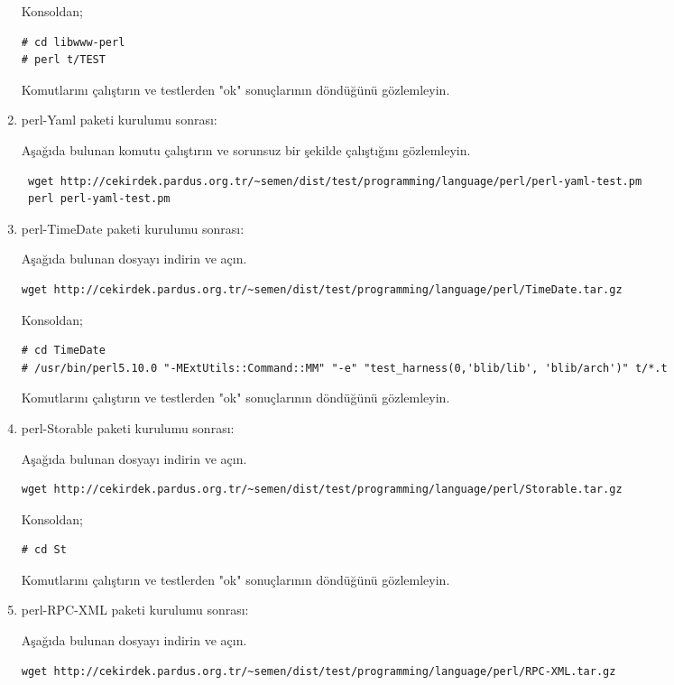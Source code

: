 \documentclass[a4paper,10pt]{article}
\begin{document}
\begin{enumerate}
Konsoldan;
\begin{verbatim}
# cd libwww-perl
# perl t/TEST
\end{verbatim}

Komutlarını çalıştırın ve testlerden "ok" sonuçlarının döndüğünü gözlemleyin.

\item perl-Yaml paketi kurulumu sonrası:

Aşağıda bulunan komutu çalıştırın ve sorunsuz bir şekilde çalıştığını gözlemleyin.
\begin{verbatim}
 wget http://cekirdek.pardus.org.tr/~semen/dist/test/programming/language/perl/perl-yaml-test.pm
 perl perl-yaml-test.pm
\end{verbatim}

\item perl-TimeDate paketi kurulumu sonrası:

Aşağıda bulunan dosyayı indirin ve açın.
\begin{verbatim}
wget http://cekirdek.pardus.org.tr/~semen/dist/test/programming/language/perl/TimeDate.tar.gz
\end{verbatim}

Konsoldan;
\begin{verbatim}
# cd TimeDate
# /usr/bin/perl5.10.0 "-MExtUtils::Command::MM" "-e" "test_harness(0,'blib/lib', 'blib/arch')" t/*.t
\end{verbatim}

Komutlarını çalıştırın ve testlerden "ok" sonuçlarının döndüğünü gözlemleyin.

\item perl-Storable paketi kurulumu sonrası:

Aşağıda bulunan dosyayı indirin ve açın.
\begin{verbatim}
wget http://cekirdek.pardus.org.tr/~semen/dist/test/programming/language/perl/Storable.tar.gz
\end{verbatim}

Konsoldan;
\begin{verbatim}
# cd St
\end{verbatim}

Komutlarını çalıştırın ve testlerden "ok" sonuçlarının döndüğünü gözlemleyin.

\item perl-RPC-XML paketi kurulumu sonrası:

Aşağıda bulunan dosyayı indirin ve açın.
\begin{verbatim}
wget http://cekirdek.pardus.org.tr/~semen/dist/test/programming/language/perl/RPC-XML.tar.gz
\end{verbatim}


\end{enumerate}
\end{document}
